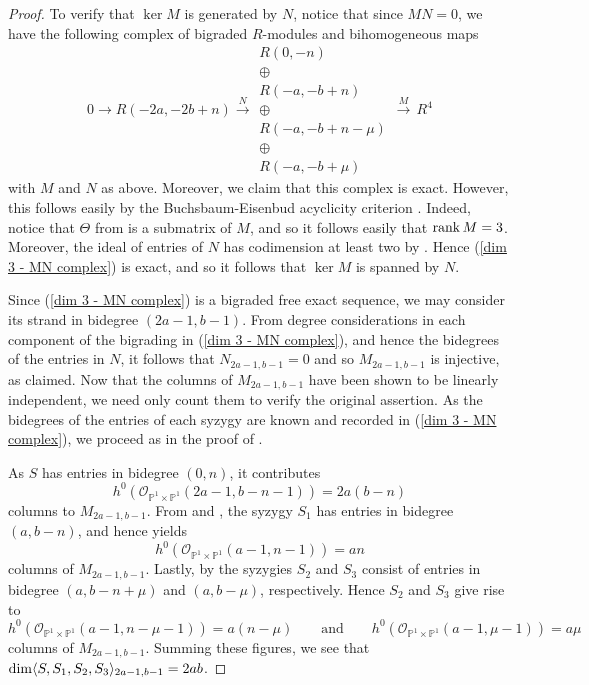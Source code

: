 \documentclass[reqno]{amsart}
\numberwithin{equation}{section}
\theoremstyle{definition}
\def\O{\mathcal{O}}
\def\P{\mathbb{P}}
\def\dim{\mathop{\rm dim}}
\def\rk{\mathop{\rm rank}}
\begin{document}
\begin{proof}
To verify that $\ker M$ is generated by $N$, notice that since $MN=0$, we have the following complex of bigraded $R$-modules and bihomogeneous maps
\begin{equation}\label{dim 3 - MN complex}
 0 \rightarrow R(-2a,-2b+n) \overset{N}{\longrightarrow} \begin{array}{c}
 R(0,-n)\\
 \oplus \\
R(-a,-b+n)\\
 \oplus \\
R(-a,-b+n-\mu)\\
\oplus\\
R(-a,-b+\mu)
\end{array} \overset{M}{\longrightarrow} \,
R^4
\end{equation}
with $M$ and $N$ as above. Moreover, we claim that this complex is exact. However, this follows easily by the Buchsbaum-Eisenbud acyclicity criterion \cite[Cor. 1]{BE73}. Indeed, notice that $\Theta$ from  is a submatrix of $M$, and so it follows easily that $\rk M =3$. Moreover, the ideal of entries of $N$ has codimension at least two by . Hence (\ref{dim 3 - MN complex}) is exact, and so it follows that $\ker M$ is spanned by $N$. 



Since (\ref{dim 3 - MN complex}) is a bigraded free exact sequence, we may consider its strand in bidegree $(2a-1,b-1)$. From degree considerations in each component of the bigrading in (\ref{dim 3 - MN complex}), and hence the bidegrees of the entries in $N$, it follows that $N_{2a-1,b-1} =0$ and so $M_{2a-1,b-1}$ is injective, as claimed. Now that the columns of $M_{2a-1,b-1}$ have been shown to be linearly independent, we need only count them to verify the original assertion. As the bidegrees of the entries of each syzygy are known and recorded in (\ref{dim 3 - MN complex}), we proceed as in the proof of . 

As $S$ has entries in bidegree $(0,n)$, it contributes
$$h^0(\O_{\P^1\times \P^1}(2a-1,b-n-1)) = 2a(b-n)$$
columns to $M_{2a-1,b-1}$. From  and , the syzygy $S_1$ has entries in bidegree $(a,b-n)$, and hence yields
$$h^0(\O_{\P^1\times \P^1}(a-1,n-1)) = an$$
columns of $M_{2a-1,b-1}$. Lastly, by  the syzygies $S_2$ and $S_3$ consist of entries in bidegree $(a,b-n+\mu)$ and $(a,b-\mu)$, respectively. Hence $S_2$ and $S_3$ give rise to
$$h^0(\O_{\P^1\times \P^1}(a-1,n-\mu-1)) = a(n-\mu)\quad\quad\text{and}\quad\quad h^0(\O_{\P^1\times \P^1}(a-1,\mu-1)) = a\mu$$
columns of $M_{2a-1,b-1}$. Summing these figures, we see that $\dim \langle S,S_1,S_2,S_3\rangle_{2a-1,b-1} = 2ab$.
\end{proof}
\end{document}
